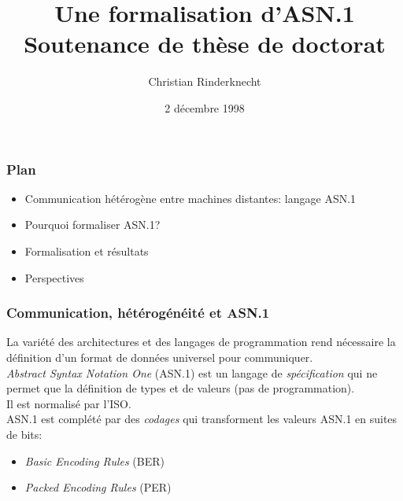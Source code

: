 \documentclass[compress,dvips,xcolor={dvipsnames},t]{beamer}
\title{Une formalisation d'ASN.1\\
Soutenance de thèse de doctorat}
\author{Christian Rinderknecht}
\date{2 décembre 1998}
\begin{document}
\frame{\maketitle}

\begin{frame}
\frametitle{Plan}

\begin{itemize}
  \item Communication hétérogène entre machines distantes: langage \mbox{ASN.1}
  \item Pourquoi formaliser \mbox{ASN.1}?
  \item Formalisation et résultats
  \item Perspectives
\end{itemize}

\end{frame}

\begin{frame}
\frametitle{Communication, hétérogénéité et ASN.1}

La variété des architectures et des langages de programmation rend
nécessaire la définition d'un format de données universel pour
communiquer. \\

{\em Abstract Syntax Notation One} (\mbox{ASN.1}) est un langage de
{\em spécification} qui ne permet que la définition de types et de
valeurs (pas de programmation). \\

Il est normalisé par l'ISO. \\

\mbox{ASN.1} est complété par des {\em codages} qui transforment les
valeurs \mbox{ASN.1} en suites de bits:

\begin{itemize}

   \item {\em Basic Encoding Rules} (BER)

   \item {\em Packed Encoding Rules} (PER)

\end{itemize}

\end{frame}
\end{document}

